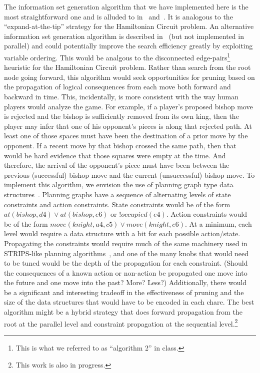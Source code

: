 \documentclass[conference]{IEEEtran}
\begin{document}
The information set generation algorithm that we have implemented here is the most straightforward one and is alluded to
in~\cite{parker05game} and~\cite{russell05efficient}.  It is analogous to the ``expand-at-the-tip'' strategy for the
Hamiltonian Circuit problem.  An alternative information set generation algorithm is described
in~\cite{richards09information} (but not implemented in parallel) and could potentially improve the search efficiency
greatly by exploiting variable ordering.  This would be analgous to the disconnected edge-pairs\footnote{This is what we
referred to as ``algorithm 2'' in class.} heuristic for the Hamiltonian Circuit problem.  Rather than search from the
root node going forward, this algorithm would seek opportunities for pruning based on the propagation of logical
consequences from each move both forward and backward in time.  This, incidentally, is more consistent with the way
human players would analyze the game.  For example, if a player's proposed bishop move is rejected and the bishop is
sufficiently removed from its own king, then the player may infer that one of his opponent's pieces is along that
rejected path.  At least one of those spaces must have been the destination of a prior move by the opponent.  If a
recent move by that bishop crossed the same path, then that would be hard evidence that those squares were empty at the
time.  And therefore, the arrival of the opponent's piece must have been between the previous (successful) bishop move
and the current (unsuccessful) bishop move.  To implement this algorithm, we envision the use of planning graph type
data structures~\cite{blum97fast}.  Planning graphs have a sequence of alternating levels of state constraints and
action constraints.  State constraints would be of the form $at(bishop,d4) \vee at(bishop,e6)$ or $!occupied(e4)$.
Action constraints would be of the form $move(knight,a4,c5) \vee move(knight,e6)$.  At a minimum, each level would
require a data structure with a bit for each possible action/state.  Propagating the constraints would require much of
the same machinery used in STRIPS-like planning algorithms~\cite{chen05solving}, and one of the many knobs that would
need to be tuned would be the depth of the propagation for each constraint.  (Should the consequences of a known action
or non-action be propagated one move into the future and one move into the past?  More?  Less?)  Additionally, there
would be a significant and interesting tradeoff in the effectiveness of pruning and the size of the data
structures that would have to be encoded in each chare.  The best algorithm might be a hybrid strategy that does forward
propagation from the root at the parallel level and constraint propagation at the sequential level.\footnote{This work
is also in progress.}
\end{document}
